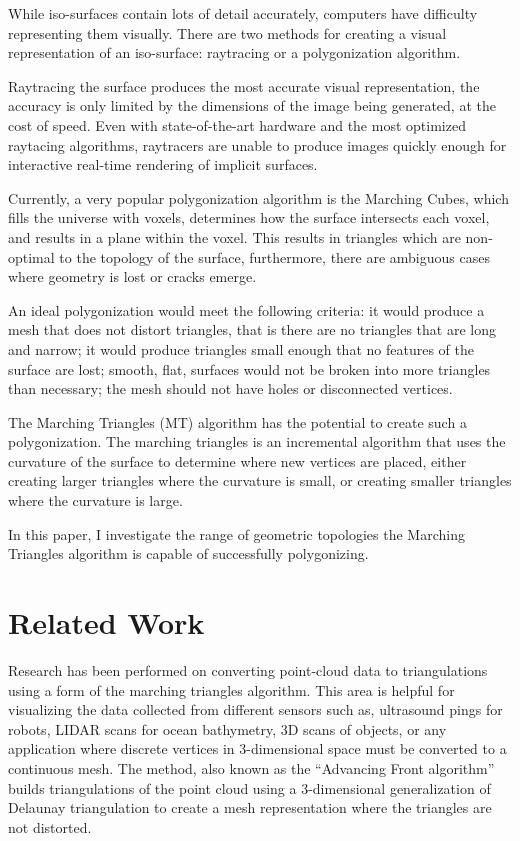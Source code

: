 \documentclass[conference]{acmsiggraph}
\begin{document}
While iso-surfaces contain lots of detail accurately, computers have difficulty
representing them visually. There are two methods for creating a visual
representation of an iso-surface: raytracing or a polygonization algorithm.

Raytracing the surface produces the most accurate visual representation, the
accuracy is only limited by the dimensions of the image being generated, at the
cost of speed. Even with state-of-the-art hardware and the most optimized
raytacing algorithms, raytracers are unable to produce images quickly enough
for interactive real-time rendering of implicit surfaces.

Currently, a very popular polygonization algorithm is the Marching Cubes, which
fills the universe with voxels, determines how the surface intersects each
voxel, and results in a plane within the voxel. This results in triangles which
are non-optimal to the topology of the surface, furthermore, there are
ambiguous cases where geometry is lost or cracks emerge.

An ideal polygonization would meet the following criteria:
it would produce a mesh that does not distort triangles, that is there are no
triangles that are long and narrow; it would produce triangles small enough
that no features of the surface are lost; smooth, flat, surfaces would not be
broken into more triangles than necessary; the mesh should not have holes or
disconnected vertices.

The Marching Triangles (MT) algorithm has the potential to create such a
polygonization. The marching triangles is an incremental algorithm that uses
the curvature of the surface to determine where new vertices are placed, either
creating larger triangles where the curvature is small, or creating smaller
triangles where the curvature is large.

In this paper, I investigate the range of geometric topologies the Marching
Triangles algorithm is capable of successfully polygonizing.

\section{Related Work}

Research has been performed on converting point-cloud data to triangulations
using a form of the marching triangles algorithm\cite{Scheidegger2005}. This
area is helpful for visualizing the data collected from different sensors
such as, ultrasound pings for robots, LIDAR scans for ocean bathymetry, 3D
scans of objects, or any application where discrete vertices in 3-dimensional
space must be converted to a continuous mesh. The method, also known as the
``Advancing Front algorithm'' builds triangulations of the point cloud using a
3-dimensional generalization of Delaunay triangulation to create a mesh
representation where the triangles are not distorted.
\end{document}
